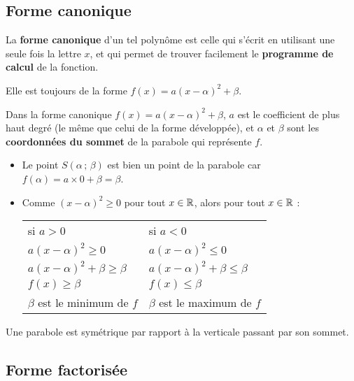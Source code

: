 \documentclass[a4paper,11pt]{article}
\begin{document}
\subsection{Forme canonique}

\begin{cdefi}
La \textbf{forme canonique} d’un tel polynôme est celle qui s’écrit en utilisant une seule fois la lettre $x$, et qui permet de trouver facilement le \textbf{programme de calcul} de la fonction.

Elle est toujours de la forme $f(x)=a(x-\alpha)^2+\beta $.
\end{cdefi}

\begin{cprop}
Dans la forme canonique $f(x)=a(x-\alpha)^2+\beta$, $a$ est le coefficient de plus haut degré (le même que celui de la forme développée), et $ \alpha $ et $ \beta $ sont les \textbf{coordonnées du sommet} de la parabole qui représente $f$.
\end{cprop}

\begin{cdemo}
\begin{itemize}[leftmargin=*]
	\item Le point $S(\alpha\,;\,\beta)$ est bien un point de la parabole car $f(\alpha)=a \times 0+\beta=\beta$.
	\item Comme $(x-\alpha)^2 \geqslant 0$ pour tout $x \in \R$, alors pour tout $x \in \R$ :
	\begin{center}
		\begin{tabularx}{12cm}{Y|Y}
			si $a>0$ & si $a<0$ \\ 			
			$a(x-\alpha)^2 \geqslant 0$ & $a(x-\alpha)^2 \leqslant 0$ \\ 
			$a(x-\alpha)^2+\beta \geqslant \beta$ & $a(x-\alpha)^2+\beta \leqslant \beta$ \\ 
			$f(x) \geqslant \beta$ & $f(x) \leqslant \beta $ \\
			$\beta$ est le minimum de $f$ & $\beta$ est le maximum de $f$\\
	\end{tabularx} 
	\end{center}
\end{itemize}
\end{cdemo}

\begin{cprop}
Une parabole est symétrique par rapport à la verticale passant par son sommet.
\end{cprop}

\subsection{Forme factorisée}
\end{document}
